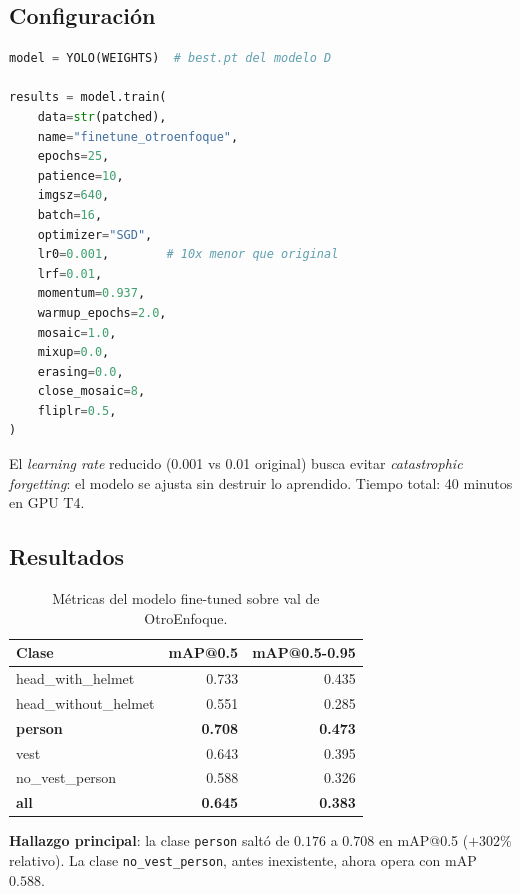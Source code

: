 \documentclass[conference]{IEEEtran}
\begin{document}
\subsection{Configuración}

\begin{lstlisting}[language=Python, basicstyle=\ttfamily\scriptsize]
model = YOLO(WEIGHTS)  # best.pt del modelo D

results = model.train(
    data=str(patched),
    name="finetune_otroenfoque",
    epochs=25,
    patience=10,
    imgsz=640,
    batch=16,
    optimizer="SGD",
    lr0=0.001,        # 10x menor que original
    lrf=0.01,
    momentum=0.937,
    warmup_epochs=2.0,
    mosaic=1.0,
    mixup=0.0,
    erasing=0.0,
    close_mosaic=8,
    fliplr=0.5,
)
\end{lstlisting}

El \textit{learning rate} reducido (0.001 vs 0.01 original) busca
evitar \emph{catastrophic forgetting}: el modelo se ajusta sin
destruir lo aprendido. Tiempo total: 40 minutos en GPU T4.

\subsection{Resultados}

\begin{table}[h]
\centering
\caption{Métricas del modelo fine-tuned sobre val de OtroEnfoque.}
\label{tab:finetuned}
\renewcommand{\arraystretch}{1.15}
\begin{tabular}{l r r}
\toprule
\textbf{Clase} & \textbf{mAP@0.5} & \textbf{mAP@0.5-0.95} \\
\midrule
head\_with\_helmet & 0.733 & 0.435 \\
head\_without\_helmet & 0.551 & 0.285 \\
\textbf{person} & \textbf{0.708} & \textbf{0.473} \\
vest & 0.643 & 0.395 \\
no\_vest\_person & 0.588 & 0.326 \\
\midrule
\textbf{all} & \textbf{0.645} & \textbf{0.383} \\
\bottomrule
\end{tabular}
\end{table}

\textbf{Hallazgo principal}: la clase \texttt{person} saltó de
$0.176$ a $0.708$ en mAP@0.5 ($+302\%$ relativo). La clase
\texttt{no\_vest\_person}, antes inexistente, ahora opera con mAP
$0.588$.

\end{document}
